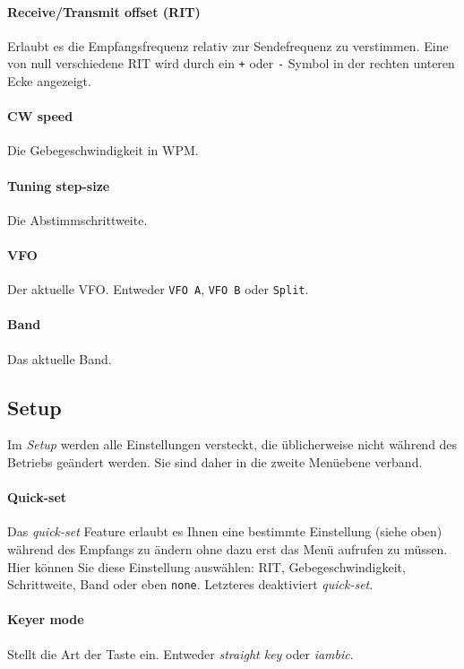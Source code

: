 \documentclass[10pt, a4paper,twoside]{scrartcl}
\begin{document}
\paragraph{Receive/Transmit offset (RIT)}
Erlaubt es die Empfangsfrequenz relativ zur Sendefrequenz zu verstimmen. Eine von null verschiedene RIT wird durch ein \texttt{+} oder \texttt{-} Symbol in der rechten unteren Ecke angezeigt.

\paragraph{CW speed}
Die Gebegeschwindigkeit in WPM.

\paragraph{Tuning step-size}
Die Abstimmschrittweite.

\paragraph{VFO}
Der aktuelle VFO. Entweder \texttt{VFO A}, \texttt{VFO B} oder \texttt{Split}.

\paragraph{Band}
Das aktuelle Band.


\subsection{Setup}
Im \emph{Setup} werden alle Einstellungen versteckt, die üblicherweise nicht während des Betriebs geändert werden. Sie sind daher in die zweite Menüebene verband.

\paragraph{Quick-set}
Das \emph{quick-set} Feature erlaubt es Ihnen eine bestimmte Einstellung (siehe oben) während des Empfangs zu ändern ohne dazu erst das Menü aufrufen zu müssen. Hier können Sie diese Einstellung auswählen: RIT, Gebegeschwindigkeit, Schrittweite, Band oder eben \texttt{none}. Letzteres deaktiviert \emph{quick-set}.

\paragraph{Keyer mode}
Stellt die Art der Taste ein. Entweder \emph{straight key} oder \emph{iambic}.
\end{document}
